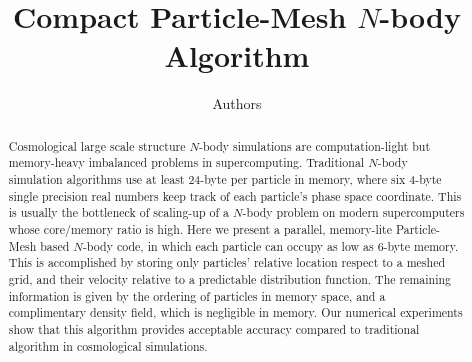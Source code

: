 \documentclass[10pt,twocolumn,preprint]{emulateapj}
\begin{document}
\title{Compact Particle-Mesh $N$-body Algorithm}
\author{Authors}



\begin{abstract}
Cosmological large scale structure $N$-body simulations are computation-light but memory-heavy imbalanced problems in supercomputing. Traditional $N$-body simulation algorithms use at least 24-byte per particle in memory, where six 4-byte single precision real numbers keep track of each particle's phase space coordinate. This is usually the bottleneck of scaling-up of a $N$-body problem on modern supercomputers whose core/memory ratio is high. Here we present a parallel, memory-lite Particle-Mesh based $N$-body code, in which each particle can occupy as low as 6-byte memory. This is accomplished by storing only particles' relative location respect to a meshed grid, and their velocity relative to a predictable distribution function. The remaining information is given by the ordering of particles in memory space, and a complimentary density field, which is negligible in memory. Our numerical experiments show that this algorithm provides acceptable accuracy compared to traditional algorithm in cosmological simulations.

\end{abstract}

\keywords{}

\maketitle
\end{document}
